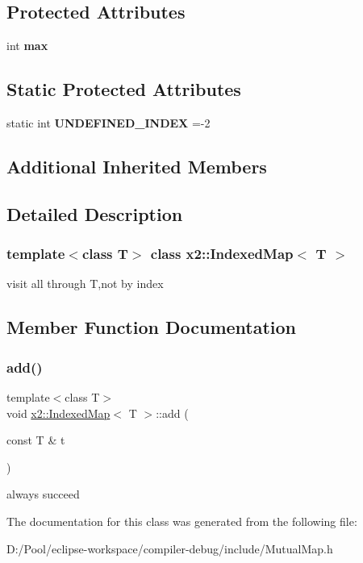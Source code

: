 \subsection*{Protected Attributes}
\begin{DoxyCompactItemize}
\item 
\mbox{\label{classx2_1_1_indexed_map_ab683c90c6f8eadc051bd74eadcb5b2b7}} 
int {\bfseries max}
\end{DoxyCompactItemize}
\subsection*{Static Protected Attributes}
\begin{DoxyCompactItemize}
\item 
\mbox{\label{classx2_1_1_indexed_map_acb56a512932a44a9f6e3245e283ec1a0}} 
static int {\bfseries U\+N\+D\+E\+F\+I\+N\+E\+D\+\_\+\+I\+N\+D\+EX} =-\/2
\end{DoxyCompactItemize}
\subsection*{Additional Inherited Members}


\subsection{Detailed Description}
\subsubsection*{template$<$class T$>$\newline
class x2\+::\+Indexed\+Map$<$ T $>$}

visit all through T,not by index 

\subsection{Member Function Documentation}
\mbox{\label{classx2_1_1_indexed_map_a76211a5e565fd668c39f00f2935d6481}} 
\subsubsection{\texorpdfstring{add()}{add()}}
{\footnotesize\ttfamily template$<$class T$>$ \\
void \hyperlink{classx2_1_1_indexed_map}{x2\+::\+Indexed\+Map}$<$ T $>$\+::add (\begin{DoxyParamCaption}\item[{const T \&}]{t }\end{DoxyParamCaption})\hspace{0.3cm}{\ttfamily [inline]}}

always succeed 

The documentation for this class was generated from the following file\+:\begin{DoxyCompactItemize}
\item 
D\+:/\+Pool/eclipse-\/workspace/compiler-\/debug/include/Mutual\+Map.\+h\end{DoxyCompactItemize}
